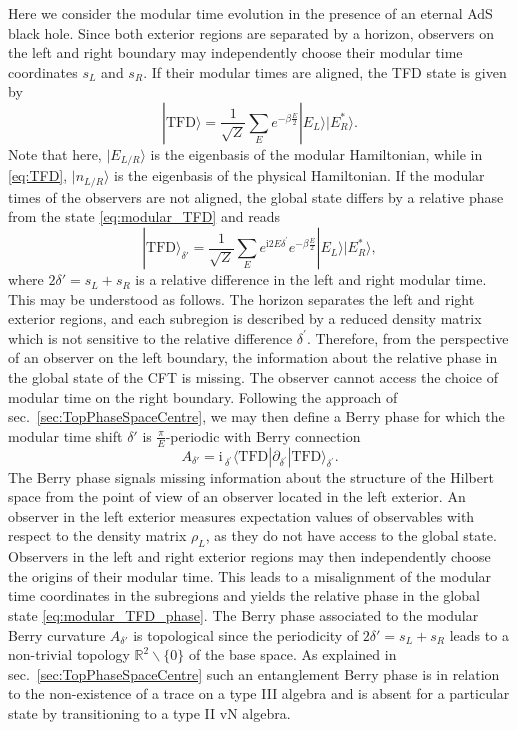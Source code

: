\documentclass[a4paper,11pt]{article}
\renewcommand{\i}{\text{i}}
\newcommand{\1}{\mathds{1}}
\newcommand{\tfd}{\text{TFD}}
\newcommand{\p}{{\prime}}
\begin{document}
Here we consider the modular time evolution in the presence of an eternal AdS black hole. Since both exterior regions are separated by a horizon, observers on the left and right boundary may independently choose their modular time coordinates $s_L$ and $s_R$. If their modular times are aligned, the TFD state is given by
\begin{equation}
    |\text{TFD}\rangle=\frac{1}{\sqrt{Z}}\sum_Ee^{-\beta\frac{E}{2}}|E_L\rangle|E_R^\ast\rangle.
    \label{eq:modular_TFD}
\end{equation}
Note that here, $|E_{L/R}\rangle$ is the eigenbasis of the modular Hamiltonian, while in \eqref{eq:TFD}, $|n_{L/R}\rangle$ is the eigenbasis of the physical Hamiltonian. If the modular times of the observers are not aligned, the global state differs by a relative phase from the state \eqref{eq:modular_TFD} and reads
\begin{equation}
    |\text{TFD}\rangle_{\delta'}=\frac{1}{\sqrt{Z}}\sum_Ee^{\i 2E\delta^\p}e^{-\beta\frac{E}{2}}|E_L\rangle|E_R^\ast\rangle,\label{eq:modular_TFD_phase}
\end{equation}
where $2\delta'=s_L+s_R$ is a relative difference in the left and right modular time. This may be understood as follows. The horizon separates the left and right exterior regions, and each subregion is described by a reduced density matrix which is not sensitive to the relative difference $\delta^\p$. Therefore, from the perspective of an observer on the left boundary, the information about the relative phase in the global state of the CFT is missing. The observer cannot access the choice of modular time on the right boundary. Following the approach of sec.~\ref{sec:TopPhaseSpaceCentre}, we may then define a Berry phase for which the modular time shift $\delta'$ is $\frac{\pi}{E}$-periodic with Berry connection
\begin{equation}
    A_{\delta'}=\i\,_{\delta^\p}\!\langle\tfd|\partial_{\delta^\p}|\tfd\rangle_{\delta^\p}.\label{eq:Berry_phase_delta}
\end{equation}
The Berry phase signals missing information about the structure of the Hilbert space from the point of view of an observer located in the left exterior. An observer in the left exterior measures expectation values of observables with respect to the density matrix $\rho_L$, as they do not have access to the global state. Observers in the left and right exterior regions may then independently choose the origins of their modular time. This leads to a misalignment of the modular time coordinates in the subregions and yields the relative phase in the global state \eqref{eq:modular_TFD_phase}. The Berry phase associated to the modular Berry curvature $A_{\delta'}$ is topological since the periodicity of $2\delta'=s_L+s_R$ leads to a non-trivial topology $\mathds{R}^2\backslash\{0\}$ of the base space. As explained in sec.~\ref{sec:TopPhaseSpaceCentre} such an entanglement Berry phase is in relation to the non-existence of a trace on a type III algebra and is absent for a particular state by transitioning to a type II vN algebra.
\end{document}
